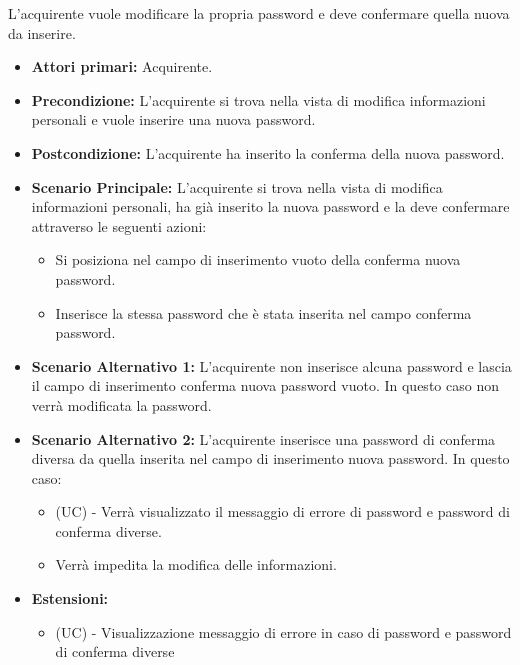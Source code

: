 L'acquirente vuole modificare la propria password e deve confermare quella nuova da inserire.
\begin{itemize}
    \item \textbf{Attori primari:} Acquirente.
    \item \textbf{Precondizione:} L'acquirente si trova nella vista di modifica informazioni personali e vuole inserire una nuova password.
    \item \textbf{Postcondizione:} L'acquirente ha inserito la conferma della nuova password.
    \item \textbf{Scenario Principale:} L'acquirente si trova nella vista di modifica informazioni personali, ha già inserito la nuova password e la deve confermare attraverso le seguenti azioni:
        \begin{itemize}
            \item Si posiziona nel campo di inserimento vuoto della conferma nuova password.
            \item Inserisce la stessa password che è stata inserita nel campo conferma password.
        \end{itemize}
    \item \textbf{Scenario Alternativo 1:} L'acquirente non inserisce alcuna password e lascia il campo di inserimento conferma nuova password vuoto. In questo caso non verrà modificata la password.
    \item \textbf{Scenario Alternativo 2:} L'acquirente inserisce una password di conferma diversa da quella inserita nel campo di inserimento nuova password. In questo caso:
    \begin{itemize}
        \item (UC) - Verrà visualizzato il messaggio di errore di password e password di conferma diverse.
        \item Verrà impedita la modifica delle informazioni.
    \end{itemize}
    \item \textbf{Estensioni:}
    \begin{itemize}
        \item (UC) - Visualizzazione messaggio di errore in caso di password e password di conferma diverse
    \end{itemize}
\end{itemize}

